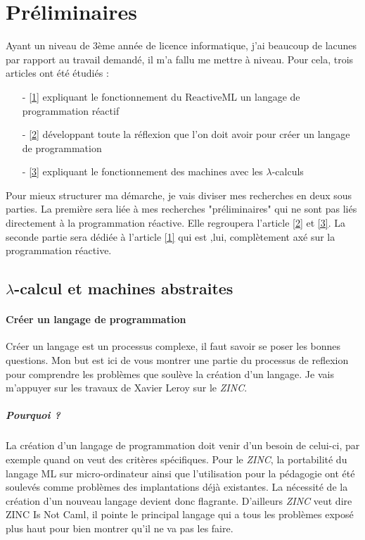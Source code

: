 \documentclass[10pt,a4paper]{article}
\begin{document}
		
	
	\section{Préliminaires}
	 
	 	Ayant un niveau de 3ème année de licence informatique, j'ai beaucoup de lacunes par rapport au travail demandé, il m'a fallu me mettre à niveau. Pour cela, trois articles ont été étudiés : 
	 	\begin{enumerate}
	 		\item[-] \hyperref[ReactiveML]{[1]} expliquant le fonctionnement du ReactiveML un langage de programmation réactif
	 		\item[-] \hyperref[ZINC]{[2]} développant toute la réflexion que l'on doit avoir pour créer un langage de programmation
		 	\item[-] \hyperref[Calculi]{[3]} expliquant le fonctionnement des machines avec les $\lambda$-calculs
		 \end{enumerate}
 		 Pour mieux structurer ma démarche, je vais diviser mes recherches en deux sous parties. La première sera liée à mes recherches "préliminaires" qui ne sont pas liés directement à la programmation réactive. Elle regroupera l'article \hyperref[ZINC]{[2]} et \hyperref[Calculi]{[3]}. La seconde partie sera dédiée à l'article \hyperref[ReactiveML]{[1]} qui est ,lui, complètement axé sur la programmation réactive. 
	 
		\subsection{$\lambda$-calcul et machines abstraites}
			
			\paragraph{Créer un langage de programmation}
			Créer un langage est un processus complexe, il faut savoir se poser les bonnes questions. Mon but est ici de vous montrer une partie du processus de reflexion pour comprendre les problèmes que soulève la création d'un langage. Je vais m'appuyer sur les travaux de Xavier Leroy sur le \textit{ZINC}.
			\medbreak
			
				\subparagraph{Pourquoi ?} 
				La création d'un langage de programmation doit venir d'un besoin de celui-ci, par exemple quand on veut des critères spécifiques. Pour le \textit{ZINC}, la portabilité du langage ML sur micro-ordinateur ainsi que l'utilisation pour la pédagogie ont été soulevés comme problèmes des implantations déjà existantes. La nécessité de la création d'un nouveau langage devient donc flagrante. D'ailleurs \textit{ZINC} veut dire ZINC Is Not Caml, il pointe le principal langage qui a tous les problèmes exposé plus haut pour bien montrer qu'il ne va pas les faire. 
				
\end{document}
